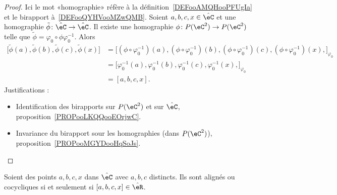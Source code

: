 \begin{proof}
    Ici le mot «homographie» réfère à la définition~\ref{DEFooAMQHooPFUgIa} et le birapport à~\ref{DEFooQYHVooMZwQMB}. Soient \( a,b,c,x\in\hat\eC\) et une homographie \( \tilde \phi\colon \hat \eC\to \hat \eC\). Il existe une homographie \( \phi\colon P(\eC^2)\to P(\eC^2)\) telle que \( \tilde \phi=\varphi_0\circ\phi\varphi_0^{-1}\). Alors
    \begin{subequations}
        \begin{align}
            \big[ \tilde \phi(a), \tilde \phi(b),\tilde \phi(c),\tilde \phi(x) \big]&=\big[  (\phi\circ\varphi_0^{-1})(a), (\phi\circ\varphi_0^{-1})(b),(\phi\circ\varphi_0^{-1})(c),  (\phi\circ\varphi_0^{-1})(x),  \big]_{\varphi_0}\\
            &=\big[  \varphi_0^{-1}(a), \varphi_0^{-1}(b),\varphi_0^{-1}(c), \varphi_0^{-1}(x),  \big]_{\varphi_0}\\
            &=[a,b,c,x].
        \end{align}
    \end{subequations}
    Justifications :
    \begin{itemize}
        \item Identification des birapports sur \( P(\eC^2)\) et sur \( \hat \eC\), proposition~\ref{PROPooLKQQooEOrjwC}.
        \item Invariance du birapport sour les homographies (dans \( P(\eC^2)\)), proposition~\ref{PROPooMGYDooHqSoJs}.
    \end{itemize}
\end{proof}

\begin{proposition}     \label{PROPooSGCJooLnOLCx}
    Soient des points \( a,b,c,x\) dans \( \hat\eC\) avec \( a,b,c\) distincts. Ils sont alignés ou cocycliques si et seulement si \( [a,b,c,x]\in \hat\eR\).
\end{proposition}

